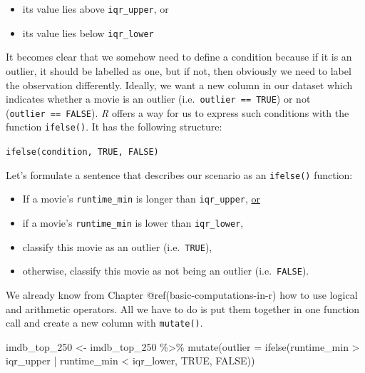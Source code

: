 \documentclass[
  letterpaper,
]{krantz}
\makeatletter
\newenvironment{Shaded}{\begin{snugshade}}{\end{snugshade}}
\newcommand{\AttributeTok}[1]{\textcolor[rgb]{0.40,0.45,0.13}{#1}}
\newcommand{\ConstantTok}[1]{\textcolor[rgb]{0.56,0.35,0.01}{#1}}
\newcommand{\FunctionTok}[1]{\textcolor[rgb]{0.28,0.35,0.67}{#1}}
\newcommand{\NormalTok}[1]{\textcolor[rgb]{0.00,0.23,0.31}{#1}}
\newcommand{\OtherTok}[1]{\textcolor[rgb]{0.00,0.23,0.31}{#1}}
\newcommand{\SpecialCharTok}[1]{\textcolor[rgb]{0.37,0.37,0.37}{#1}}
\newenvironment{kframe}{%
\medskip{}
\setlength{\fboxsep}{.8em}
 \def\at@end@of@kframe{}%
 \ifinner\ifhmode%
  \def\at@end@of@kframe{\end{minipage}}%
  \begin{minipage}{\columnwidth}%
 \fi\fi%
 \def\FrameCommand##1{\hskip\@totalleftmargin \hskip-\fboxsep
 \colorbox{shadecolor}{##1}\hskip-\fboxsep
     \hskip-\linewidth \hskip-\@totalleftmargin \hskip\columnwidth}%
 \MakeFramed {\advance\hsize-\width
   \@totalleftmargin\z@ \linewidth\hsize
   \@setminipage}}%
 {\par\unskip\endMakeFramed%
 \at@end@of@kframe}
\renewenvironment{Shaded}{\begin{kframe}}{\end{kframe}}
\makeatother
\begin{document}
\begin{itemize}
\item
  its value lies above \texttt{iqr\_upper}, or
\item
  its value lies below \texttt{iqr\_lower}
\end{itemize}

It becomes clear that we somehow need to define a condition because if
it is an outlier, it should be labelled as one, but if not, then
obviously we need to label the observation differently. Ideally, we want
a new column in our dataset which indicates whether a movie is an
outlier (i.e.~\texttt{outlier\ ==\ TRUE}) or not
(\texttt{outlier\ ==\ FALSE}). \emph{R} offers a way for us to express
such conditions with the function \texttt{ifelse()}. It has the
following structure:

\label{ifelse-function}
\texttt{ifelse(condition,\ TRUE,\ FALSE)}

Let's formulate a sentence that describes our scenario as an
\texttt{ifelse()} function:

\begin{itemize}
\item
  If a movie's \texttt{runtime\_min} is longer than \texttt{iqr\_upper},
  \ul{or}
\item
  if a movie's \texttt{runtime\_min} is lower than \texttt{iqr\_lower},
\item
  classify this movie as an outlier (i.e.~\texttt{TRUE}),
\item
  otherwise, classify this movie as not being an outlier
  (i.e.~\texttt{FALSE}).
\end{itemize}

We already know from Chapter @ref(basic-computations-in-r) how to use
logical and arithmetic operators. All we have to do is put them together
in one function call and create a new column with \texttt{mutate()}.

\begin{Shaded}
\begin{Highlighting}[]
\NormalTok{imdb\_top\_250 }\OtherTok{\textless{}{-}}
\NormalTok{  imdb\_top\_250 }\SpecialCharTok{\%\textgreater{}\%}
  \FunctionTok{mutate}\NormalTok{(}\AttributeTok{outlier =} \FunctionTok{ifelse}\NormalTok{(runtime\_min }\SpecialCharTok{\textgreater{}}\NormalTok{ iqr\_upper }\SpecialCharTok{|}
\NormalTok{                            runtime\_min }\SpecialCharTok{\textless{}}\NormalTok{ iqr\_lower,}
                          \ConstantTok{TRUE}\NormalTok{, }\ConstantTok{FALSE}\NormalTok{))}
\end{Highlighting}
\end{Shaded}
\end{document}

